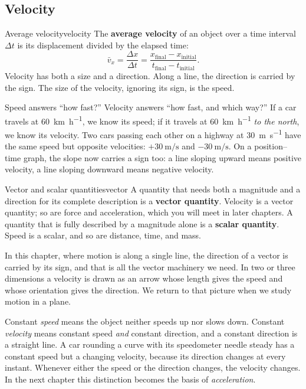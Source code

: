 \documentclass[11pt,twoside,openany]{book}
\begin{document}
\subsection{Velocity}

\begin{definition}{Average velocity}{velocity}
The \textbf{average velocity} of an object over a time interval $\Delta t$ is its displacement divided by the elapsed time:
\[
\bar v_x = \frac{\Delta x}{\Delta t} = \frac{x_{\text{final}} - x_{\text{initial}}}{t_{\text{final}} - t_{\text{initial}}}.
\]
Velocity has both a size and a direction. Along a line, the direction is carried by the sign. The size of the velocity, ignoring its sign, is the speed.
\end{definition}

Speed answers ``how fast?'' Velocity answers ``how fast, and which way?'' If a car travels at \SI{60}{\kilo\metre\per\hour}, we know its speed; if it travels at \SI{60}{\kilo\metre\per\hour} \emph{to the north}, we know its velocity. Two cars passing each other on a highway at \SI{30}{\metre\per\second} have the same speed but opposite velocities: $+\SI{30}{\metre\per\second}$ and $-\SI{30}{\metre\per\second}$. On a position--time graph, the slope now carries a sign too: a line sloping upward means positive velocity, a line sloping downward means negative velocity.

\begin{definition}{Vector and scalar quantities}{vector}
A quantity that needs both a magnitude and a direction for its complete description is a \textbf{vector quantity}. Velocity is a vector quantity; so are force and acceleration, which you will meet in later chapters. A quantity that is fully described by a magnitude alone is a \textbf{scalar quantity}. Speed is a scalar, and so are distance, time, and mass.
\end{definition}

In this chapter, where motion is along a single line, the direction of a vector is carried by its sign, and that is all the vector machinery we need. In two or three dimensions a velocity is drawn as an arrow whose length gives the speed and whose orientation gives the direction. We return to that picture when we study motion in a plane.

\begin{keyidea}
Constant \emph{speed} means the object neither speeds up nor slows down. Constant \emph{velocity} means constant speed \emph{and} constant direction, and a constant direction is a straight line. A car rounding a curve with its speedometer needle steady has a constant speed but a changing velocity, because its direction changes at every instant. Whenever either the speed or the direction changes, the velocity changes. In the next chapter this distinction becomes the basis of \emph{acceleration}.
\end{keyidea}
\end{document}
